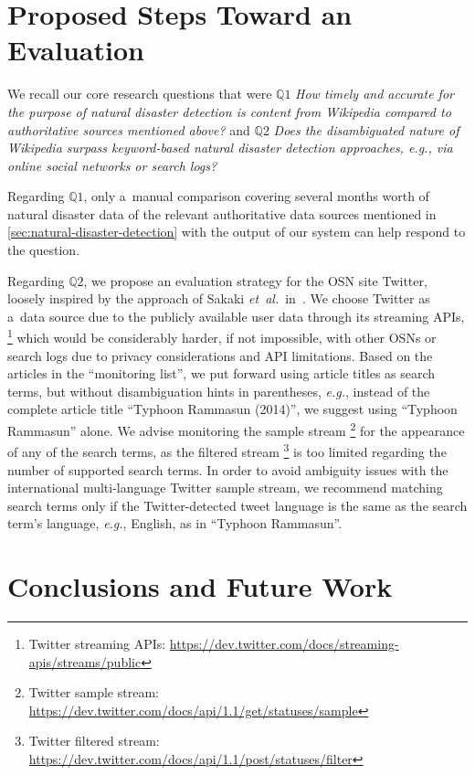 \documentclass[runningheads,a4paper]{llncs}
\begin{document}
\section{Proposed Steps Toward an Evaluation}

We recall our core research questions that were
$\mathbb{Q}1$ \emph{How timely and accurate for the purpose
of natural disaster detection is content from Wikipedia
compared to authoritative sources mentioned above?} and
$\mathbb{Q}2$ \emph{Does the disambiguated nature of Wikipedia
surpass keyword-based natural disaster detection approaches,
\emph{e.g.}, via online social networks or search logs?}

Regarding $\mathbb{Q}1$, only a~manual comparison
covering several months worth
of natural disaster data of the relevant authoritative data sources
mentioned in \autoref{sec:natural-disaster-detection}
with the output of our system can help respond to the question.

Regarding $\mathbb{Q}2$, we propose an evaluation strategy
for the OSN site Twitter,
loosely inspired by the approach of Sakaki \emph{et~al.}\
in~\cite{sakaki2010earthquake}.
We choose Twitter as a~data source due to the publicly available user data
through its streaming APIs,%
\footnote{Twitter streaming APIs:
\url{https://dev.twitter.com/docs/streaming-apis/streams/public}}
which would be considerably harder, if not impossible, with other OSNs or search logs
due to privacy considerations and API limitations.
Based on the articles in the ``monitoring list'',
we put forward using article titles as search terms,
but without disambiguation hints in parentheses,
\emph{e.g.}, instead of the complete article title
``Typhoon Rammasun (2014)'', we suggest using ``Typhoon Rammasun'' alone.
We advise monitoring the sample stream%
\footnote{Twitter sample stream:
\url{https://dev.twitter.com/docs/api/1.1/get/statuses/sample}}
for the appearance of any of the search terms,
as the filtered stream%
\footnote{Twitter filtered stream:
\url{https://dev.twitter.com/docs/api/1.1/post/statuses/filter}}
is too limited regarding the number of supported search terms.
In order to avoid ambiguity issues with the
international multi-language Twitter sample stream,
we recommend matching search terms only
if the Twitter-detected tweet language is the same
as the search term's language, \emph{e.g.}, English, as in ``Typhoon Rammasun''.


\section{Conclusions and Future Work}



\end{document}
